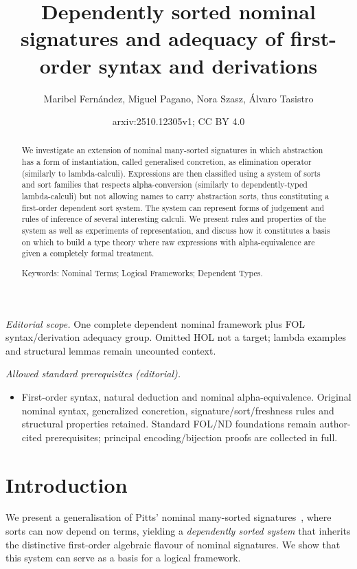 \documentclass[11pt,a4paper]{amsart}
\title{Dependently sorted nominal signatures and adequacy of first-order syntax and derivations}
\author{Maribel Fernández, Miguel Pagano, Nora Szasz, Álvaro Tasistro}
\date{arxiv:2510.12305v1; CC BY 4.0}
\newcounter{s}
\begin{document}
\maketitle
\noindent\textit{Editorial scope.} One complete dependent nominal framework plus FOL syntax/derivation adequacy group. Omitted HOL not a target; lambda examples and structural lemmas remain uncounted context.\par\medskip
\noindent\textit{Allowed standard prerequisites (editorial).}\begin{itemize}
\item First-order syntax, natural deduction and nominal alpha-equivalence. Original nominal syntax, generalized concretion, signature/sort/freshness rules and structural properties retained. Standard FOL/ND foundations remain author-cited prerequisites; principal encoding/bijection proofs are collected in full.
\end{itemize}\medskip
\begin{abstract}
  We investigate an extension of 
  nominal many-sorted signatures in which abstraction has a form of instantiation, called generalised concretion, as elimination operator (similarly to lambda-calculi). 
  Expressions are then classified using a system of sorts and sort families that respects alpha-conversion (similarly to dependently-typed lambda-calculi) but
  not allowing names to carry abstraction sorts, thus constituting a first-order dependent sort system. 
  The system can represent forms of judgement and rules of inference of several interesting calculi. 
  We present rules and properties of the system as well as experiments of representation, and discuss how it constitutes a basis on which to build a type theory where raw expressions with alpha-equivalence are given a completely formal treatment.

\noindent
  Keywords: {Nominal Terms; Logical Frameworks; Dependent Types.}
\end{abstract}
%
\section{Introduction}

We present a generalisation of Pitts' nominal many-sorted signatures~\cite{pitts:alpsri}, where sorts can now depend on terms, yielding a \emph{dependently sorted system} that inherits the distinctive first-order algebraic flavour of nominal signatures.
We show that this system can serve as a basis for a logical framework.
\end{document}
